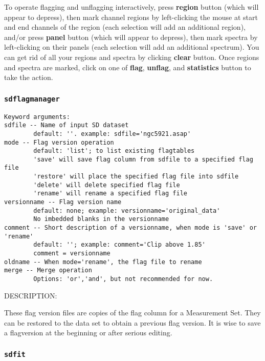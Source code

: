 To operate flagging and unflagging interactively,
press {\bf region} button (which will appear to depress), 
then mark channel regions by left-clicking the mouse at start 
and end channels of the region (each selection will add an additional region), 
and/or press {\bf panel} button (which will appear to depress),
then mark spectra by left-clicking on their panels (each selection 
will add an additional spectrum).
You can get rid of all your regions and spectra by clicking {\bf clear} 
button.
Once regions and spectra are marked, click on one of {\bf flag},
{\bf unflag}, and {\bf statistics} button to take the action.


\subsubsection{{\tt sdflagmanager}}
\label{section:sd.sdtasks.tasks.sdflagmanager}

\begin{verbatim}
Keyword arguments:
sdfile -- Name of input SD dataset
        default: ''. example: sdfile='ngc5921.asap'
mode -- Flag version operation
        default: 'list'; to list existing flagtables
        'save' will save flag column from sdfile to a specified flag file
        'restore' will place the specified flag file into sdfile
        'delete' will delete specified flag file
        'rename' will rename a specified flag file
versionname -- Flag version name
        default: none; example: versionname='original_data'
        No imbedded blanks in the versionname
comment -- Short description of a versionname, when mode is 'save' or 'rename'
        default: ''; example: comment='Clip above 1.85'
        comment = versionname
oldname -- When mode='rename', the flag file to rename
merge -- Merge operation
        Options: 'or','and', but not recommended for now.

\end{verbatim}

        DESCRIPTION:

        These flag version files are copies of the flag column for a
        Measurement Set.  They can be restored to the data set to obtain
        a previous flag version.  It is wise to
        save a flagversion at the beginning or after serious editing.    


\subsubsection{{\tt sdfit}}
\label{section:sd.sdtasks.tasks.sdfit}

